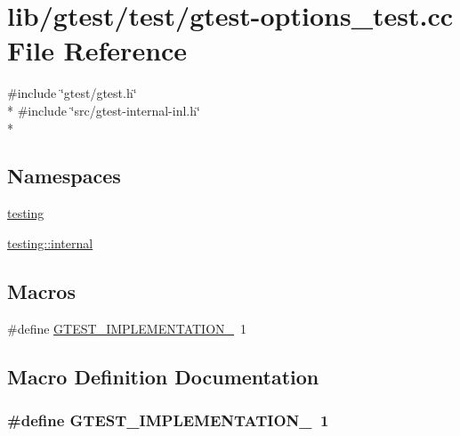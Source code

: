 \hypertarget{gtest-options__test_8cc}{\section{lib/gtest/test/gtest-\/options\-\_\-test.cc File Reference}
\label{gtest-options__test_8cc}
}
{\ttfamily \#include \char`\"{}gtest/gtest.\-h\char`\"{}}\\*
{\ttfamily \#include \char`\"{}src/gtest-\/internal-\/inl.\-h\char`\"{}}\\*
\subsection*{Namespaces}
\begin{DoxyCompactItemize}
\item 
\hyperlink{namespacetesting}{testing}
\item 
\hyperlink{namespacetesting_1_1internal}{testing\-::internal}
\end{DoxyCompactItemize}
\subsection*{Macros}
\begin{DoxyCompactItemize}
\item 
\#define \hyperlink{gtest-options__test_8cc_a83bd232fd1077579fada92c31bb7469f}{G\-T\-E\-S\-T\-\_\-\-I\-M\-P\-L\-E\-M\-E\-N\-T\-A\-T\-I\-O\-N\-\_\-}~1
\end{DoxyCompactItemize}


\subsection{Macro Definition Documentation}
\hypertarget{gtest-options__test_8cc_a83bd232fd1077579fada92c31bb7469f}{
\subsubsection[{G\-T\-E\-S\-T\-\_\-\-I\-M\-P\-L\-E\-M\-E\-N\-T\-A\-T\-I\-O\-N\-\_\-}]{\setlength{\rightskip}{0pt plus 5cm}\#define G\-T\-E\-S\-T\-\_\-\-I\-M\-P\-L\-E\-M\-E\-N\-T\-A\-T\-I\-O\-N\-\_\-~1}}\label{gtest-options__test_8cc_a83bd232fd1077579fada92c31bb7469f}


